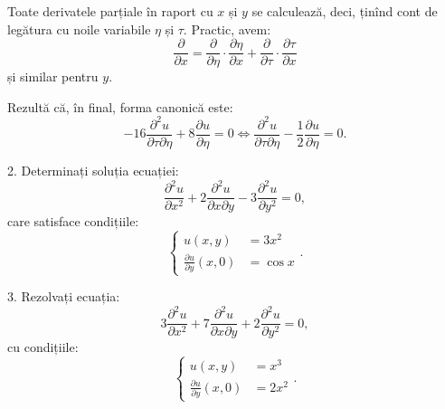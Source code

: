 \documentclass[11pt,a4paper]{article}
\theoremstyle{dotless}
\theoremstyle{dotlessdr}
\begin{document}
Toate derivatele parțiale în raport cu $ x $ și $ y $ se calculează, deci, ținînd cont de legătura
cu noile variabile $ \eta $ și $ \tau $. Practic, avem:
\[
  \frac{\partial}{\partial x} = \frac{\partial}{\partial \eta} \cdot \frac{\partial \eta}{\partial x} + %
  \frac{\partial}{\partial \tau} \cdot \frac{\partial \tau}{\partial x}
\]
și similar pentru $ y $.

Rezultă că, în final, forma canonică este:
\[
  -16 \frac{\partial^2 u}{\partial \tau \partial \eta} + 8 \frac{\partial u}{\partial \eta} = 0 %
  \Leftrightarrow \frac{\partial^2 u}{\partial \tau \partial \eta} - %
  \frac{1}{2} \frac{\partial u}{\partial \eta} = 0.
\]

\vspace{1cm}

2. Determinați soluția ecuației:
\[
  \frac{\partial^2 u}{\partial x^2} + 2 \frac{\partial^2 u}{\partial x \partial y} - %
  3 \frac{\partial^2 u}{\partial y^2} = 0,
\]
care satisface condițiile:
\[
  \begin{cases}
    u(x, y) &= 3x^2 \\
    \frac{\partial u}{\partial y}(x, 0) &= \cos x
  \end{cases}.
\]

\vspace{1cm}

3. Rezolvați ecuația:
\[
  3 \frac{\partial^2 u}{\partial x^2} + 7 \frac{\partial^2 u}{\partial x\partial y} + %
  2 \frac{\partial^2 u}{\partial y^2} = 0,
\]
cu condițiile:
\[
  \begin{cases}
    u(x, y) &= x^3 \\
    \frac{\partial u}{\partial y}(x, 0) &= 2x^2
  \end{cases}.
\]
\end{document}
